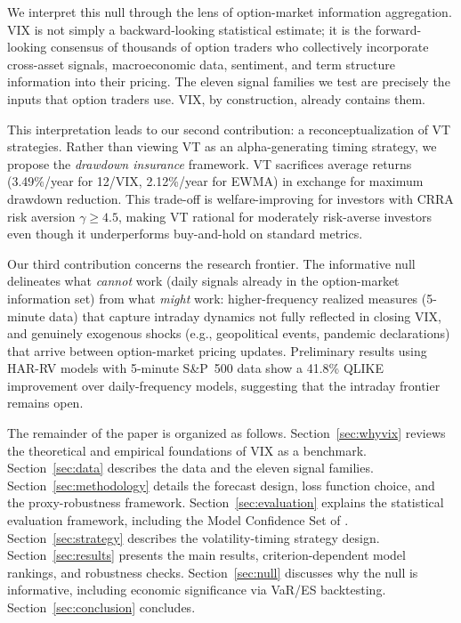 \documentclass[12pt,a4paper]{article}
\begin{document}
We interpret this null through the lens of option-market information aggregation. VIX is not simply a backward-looking statistical estimate; it is the forward-looking consensus of thousands of option traders who collectively incorporate cross-asset signals, macroeconomic data, sentiment, and term structure information into their pricing. The eleven signal families we test are precisely the inputs that option traders use. VIX, by construction, already contains them.

This interpretation leads to our second contribution: a reconceptualization of VT strategies. Rather than viewing VT as an alpha-generating timing strategy, we propose the \emph{drawdown insurance} framework. VT sacrifices average returns (3.49\%/year for 12/VIX, 2.12\%/year for EWMA) in exchange for maximum drawdown reduction. This trade-off is welfare-improving for investors with CRRA risk aversion $\gamma \geq 4.5$, making VT rational for moderately risk-averse investors even though it underperforms buy-and-hold on standard metrics.

Our third contribution concerns the research frontier. The informative null delineates what \emph{cannot} work (daily signals already in the option-market information set) from what \emph{might} work: higher-frequency realized measures (5-minute data) that capture intraday dynamics not fully reflected in closing VIX, and genuinely exogenous shocks (e.g., geopolitical events, pandemic declarations) that arrive between option-market pricing updates. Preliminary results using HAR-RV models with 5-minute S\&P~500 data show a 41.8\% QLIKE improvement over daily-frequency models, suggesting that the intraday frontier remains open.

The remainder of the paper is organized as follows. Section~\ref{sec:whyvix} reviews the theoretical and empirical foundations of VIX as a benchmark. Section~\ref{sec:data} describes the data and the eleven signal families. Section~\ref{sec:methodology} details the forecast design, loss function choice, and the \citet{patton2011} proxy-robustness framework. Section~\ref{sec:evaluation} explains the statistical evaluation framework, including the Model Confidence Set of \citet{hansen2011mcs}. Section~\ref{sec:strategy} describes the volatility-timing strategy design. Section~\ref{sec:results} presents the main results, criterion-dependent model rankings, and robustness checks. Section~\ref{sec:null} discusses why the null is informative, including economic significance via VaR/ES backtesting. Section~\ref{sec:conclusion} concludes.
\end{document}
